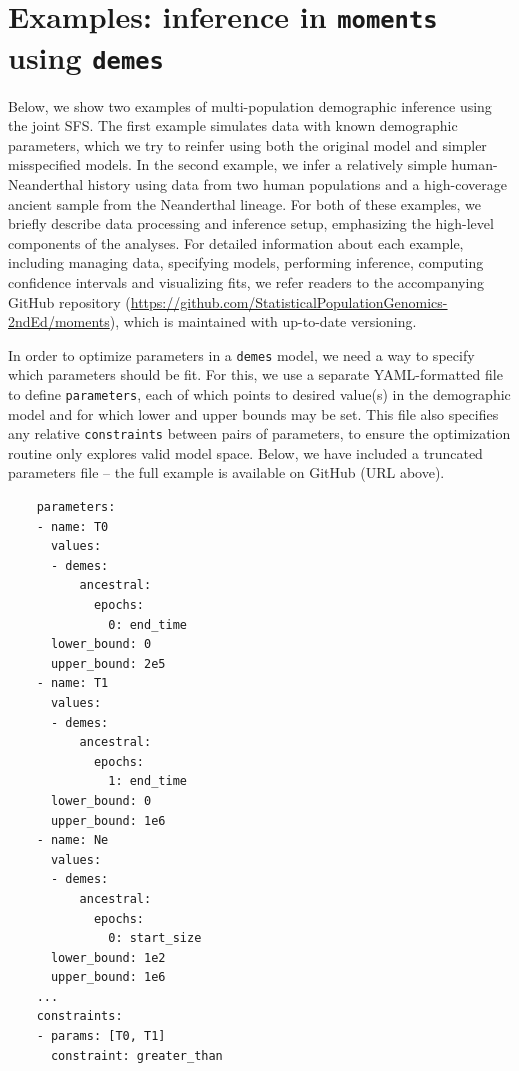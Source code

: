 \documentclass[]{article}
\newcommand{\moments}{\texttt{moments}\xspace}
\newcommand{\demes}{\texttt{demes}\xspace}
\begin{document}
\section*{Examples: inference in \moments using \demes}

Below, we show two examples of multi-population demographic inference using the
joint SFS. The first example simulates data with known demographic parameters,
which we try to reinfer using both the original model and simpler
misspecified models. In the second example, we infer a relatively simple
human-Neanderthal history using data from two human populations and a
high-coverage ancient sample from the Neanderthal lineage. For both of these
examples, we briefly describe data processing and inference setup, emphasizing
the high-level components of the analyses. For detailed information about each
example, including managing data, specifying models, performing inference,
computing confidence intervals and visualizing fits, we refer readers to the
accompanying GitHub repository
(\url{https://github.com/StatisticalPopulationGenomics-2ndEd/moments}), which
is maintained with up-to-date versioning.

In order to optimize parameters in a \demes model, we need a way to specify
which parameters should be fit. For this, we use a separate YAML-formatted file
to define \texttt{parameters}, each of which points to desired value(s) in the
demographic model and for which lower and upper bounds may be set. This file
also specifies any relative \texttt{constraints} between pairs of parameters,
to ensure the optimization routine only explores valid model space. Below, we
have included a truncated parameters file -- the full example is available on
GitHub (URL above).
\begin{verbatim}
    parameters:
    - name: T0
      values:
      - demes:
          ancestral:
            epochs:
              0: end_time
      lower_bound: 0
      upper_bound: 2e5
    - name: T1
      values:
      - demes:
          ancestral:
            epochs:
              1: end_time
      lower_bound: 0
      upper_bound: 1e6
    - name: Ne
      values:
      - demes:
          ancestral:
            epochs:
              0: start_size
      lower_bound: 1e2
      upper_bound: 1e6
    ...
    constraints:
    - params: [T0, T1]
      constraint: greater_than
\end{verbatim}
\end{document}
